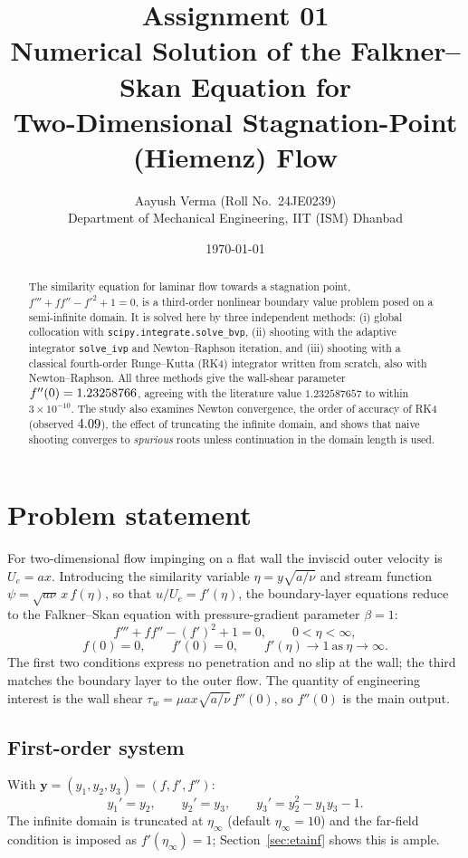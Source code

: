 \documentclass[11pt,a4paper]{article}
\title{\textbf{Assignment 01}\\[4pt]
\large Numerical Solution of the Falkner--Skan Equation for\\ Two-Dimensional Stagnation-Point (Hiemenz) Flow}
\author{Aayush Verma \quad (Roll No.\ 24JE0239)\\ Department of Mechanical Engineering, IIT (ISM) Dhanbad}
\date{\today}
\begin{document}
\maketitle

\begin{abstract}
The similarity equation for laminar flow towards a stagnation point,
$f''' + ff'' - f'^2 + 1 = 0$, is a third-order nonlinear boundary value problem
posed on a semi-infinite domain. It is solved here by three independent methods:
(i) global collocation with \texttt{scipy.integrate.solve\_bvp},
(ii) shooting with the adaptive integrator \texttt{solve\_ivp} and Newton--Raphson iteration, and
(iii) shooting with a classical fourth-order Runge--Kutta (RK4) integrator written from scratch, also with Newton--Raphson.
All three methods give the wall-shear parameter $f''(0) = 1.23258766$, agreeing with the literature
value $1.232587657$ to within $3\times10^{-10}$. The study also examines Newton convergence,
the order of accuracy of RK4 (observed $4.09$), the effect of truncating the infinite domain, and
shows that naive shooting converges to \emph{spurious} roots unless continuation in the domain length is used.
\end{abstract}

\section{Problem statement}
For two-dimensional flow impinging on a flat wall the inviscid outer velocity is $U_e = a x$.
Introducing the similarity variable $\eta = y\sqrt{a/\nu}$ and stream function
$\psi = \sqrt{a\nu}\,x\,f(\eta)$, so that $u/U_e = f'(\eta)$, the boundary-layer equations reduce to the
Falkner--Skan equation with pressure-gradient parameter $\beta = 1$:
\begin{equation}
f''' + f f'' - (f')^2 + 1 = 0, \qquad 0 < \eta < \infty,
\label{eq:fs}
\end{equation}
\begin{equation}
f(0) = 0, \qquad f'(0) = 0, \qquad f'(\eta) \to 1 \ \text{as}\ \eta\to\infty .
\label{eq:bc}
\end{equation}
The first two conditions express no penetration and no slip at the wall; the third matches the
boundary layer to the outer flow. The quantity of engineering interest is the wall shear
$\tau_w = \mu a x \sqrt{a/\nu}\, f''(0)$, so $f''(0)$ is the main output.

\subsection*{First-order system}
With $\mathbf{y} = (y_1,y_2,y_3) = (f, f', f'')$:
\begin{equation}
y_1' = y_2, \qquad y_2' = y_3, \qquad y_3' = y_2^2 - y_1 y_3 - 1 .
\label{eq:sys}
\end{equation}
The infinite domain is truncated at $\eta_\infty$ (default $\eta_\infty = 10$) and the far-field
condition is imposed as $f'(\eta_\infty) = 1$; Section~\ref{sec:etainf} shows this is ample.
\end{document}

